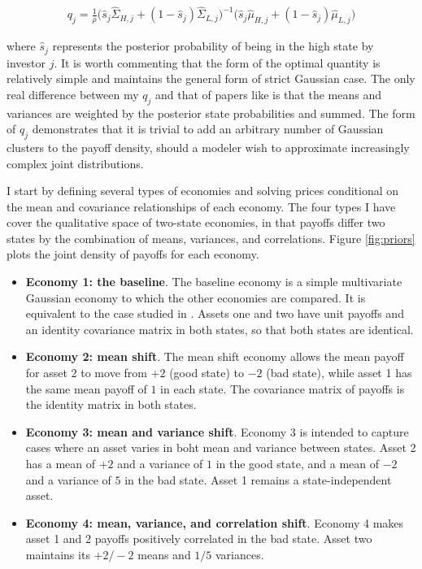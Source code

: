 \documentclass{article}
\begin{document}
\newcommand{\shat}{\hat s_j}
\newcommand{\hShat}{\hat \Sigma_{H,j}}
\newcommand{\lShat}{\hat \Sigma_{L,j}}
\newcommand{\hMhat}{\hat \mu_{H,j}}
\newcommand{\lMhat}{\hat \mu_{L,j}}
\begin{align}
    q_j = \frac{1}{\rho}\big(\shat \hShat + (1-\shat) \lShat\big)^{-1}\big(\shat \hMhat + (1-\shat) \lMhat\big)
\end{align}

\noindent where $\shat$ represents the posterior probability of being in the high state by investor $j$. It is worth commenting that the form of the optimal quantity is relatively simple and maintains the general form of strict Gaussian case. The only real difference between my $q_j$ and that of papers like \textcite{kacperczyk_rational_2016} is that the means and variances are weighted by the posterior state probabilities and summed. The form of $q_j$ demonstrates that it is trivial to add an arbitrary number of Gaussian clusters to the payoff density, should a modeler wish to approximate increasingly complex joint distributions.

I start by defining several types of economies and solving prices conditional on the mean and covariance relationships of each economy. The four types I have cover the qualitative space of two-state economies, in that payoffs differ two states by the combination of means, variances, and correlations. Figure \ref{fig:priors} plots the joint density of payoffs for each economy.

\begin{itemize}
    \item \textbf{Economy 1: the baseline}. The baseline economy is a simple multivariate Gaussian economy to which the other economies are compared. It is equivalent to the case studied in \textcite{kacperczyk_rational_2016}. Assets one and two have unit payoffs and an identity covariance matrix in both states, so that both states are identical.
    
    \item \textbf{Economy 2: mean shift}. The mean shift economy allows the mean payoff for asset 2 to move from $+2$ (good state) to $-2$ (bad state), while asset 1 has the same mean payoff of $1$ in each state. The covariance matrix of payoffs is the identity matrix in both states.

    \item \textbf{Economy 3: mean and variance shift}. Economy 3 is intended to capture cases where an asset varies in boht mean and variance between states. Asset 2 has a mean of $+2$ and a variance of $1$ in the good state, and a mean of $-2$ and a variance of $5$ in the bad state. Asset 1 remains a state-independent asset.
    
    \item \textbf{Economy 4: mean, variance, and correlation shift}. Economy 4 makes asset 1 and 2 payoffs positively correlated in the bad state. Asset two maintains its $+2/-2$ means and $1/5$ variances.
\end{itemize}
    
\end{document}
